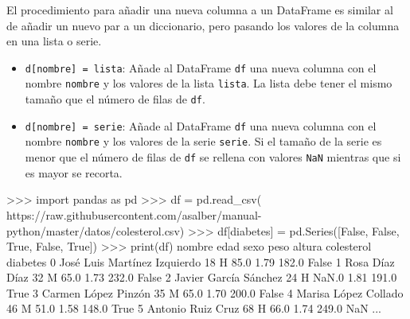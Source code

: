 \documentclass[
  spanish,
  a4paper,
]{scrreport}
\newenvironment{Shaded}{\begin{snugshade}}{\end{snugshade}}
\newcommand{\BuiltInTok}[1]{\textcolor[rgb]{0.00,0.23,0.31}{#1}}
\newcommand{\DecValTok}[1]{\textcolor[rgb]{0.68,0.00,0.00}{#1}}
\newcommand{\FloatTok}[1]{\textcolor[rgb]{0.68,0.00,0.00}{#1}}
\newcommand{\ImportTok}[1]{\textcolor[rgb]{0.00,0.46,0.62}{#1}}
\newcommand{\NormalTok}[1]{\textcolor[rgb]{0.00,0.23,0.31}{#1}}
\newcommand{\OperatorTok}[1]{\textcolor[rgb]{0.37,0.37,0.37}{#1}}
\newcommand{\StringTok}[1]{\textcolor[rgb]{0.13,0.47,0.30}{#1}}
\newcommand{\VariableTok}[1]{\textcolor[rgb]{0.07,0.07,0.07}{#1}}
\begin{document}
El procedimiento para añadir una nueva columna a un DataFrame es similar
al de añadir un nuevo par a un diccionario, pero pasando los valores de
la columna en una lista o serie.

\begin{itemize}
\item
  \texttt{d{[}nombre{]}\ =\ lista}: Añade al DataFrame \texttt{df} una
  nueva columna con el nombre \texttt{nombre} y los valores de la lista
  \texttt{lista}. La lista debe tener el mismo tamaño que el número de
  filas de \texttt{df}.
\item
  \texttt{d{[}nombre{]}\ =\ serie}: Añade al DataFrame \texttt{df} una
  nueva columna con el nombre \texttt{nombre} y los valores de la serie
  \texttt{serie}. Si el tamaño de la serie es menor que el número de
  filas de \texttt{df} se rellena con valores \texttt{NaN} mientras que
  si es mayor se recorta.
\end{itemize}

\begin{Shaded}
\begin{Highlighting}[]
\OperatorTok{\textgreater{}\textgreater{}\textgreater{}} \ImportTok{import}\NormalTok{ pandas }\ImportTok{as}\NormalTok{ pd}
\OperatorTok{\textgreater{}\textgreater{}\textgreater{}}\NormalTok{ df }\OperatorTok{=}\NormalTok{ pd.read\_csv(}
\StringTok{\textquotesingle{}https://raw.githubusercontent.com/asalber/manual{-}python/master/datos/colesterol.csv\textquotesingle{}}\NormalTok{)}
\OperatorTok{\textgreater{}\textgreater{}\textgreater{}}\NormalTok{ df[}\StringTok{\textquotesingle{}diabetes\textquotesingle{}}\NormalTok{] }\OperatorTok{=}\NormalTok{ pd.Series([}\VariableTok{False}\NormalTok{, }\VariableTok{False}\NormalTok{, }\VariableTok{True}\NormalTok{, }\VariableTok{False}\NormalTok{, }\VariableTok{True}\NormalTok{])}
\OperatorTok{\textgreater{}\textgreater{}\textgreater{}} \BuiltInTok{print}\NormalTok{(df)}
\NormalTok{                              nombre  edad sexo    peso  altura    colesterol diabetes}
\DecValTok{0}\NormalTok{       José Luis Martínez Izquierdo    }\DecValTok{18}\NormalTok{    H    }\FloatTok{85.0}    \FloatTok{1.79}         \FloatTok{182.0}    \VariableTok{False}
\DecValTok{1}\NormalTok{                     Rosa Díaz Díaz    }\DecValTok{32}\NormalTok{    M    }\FloatTok{65.0}    \FloatTok{1.73}         \FloatTok{232.0}    \VariableTok{False}
\DecValTok{2}\NormalTok{              Javier García Sánchez    }\DecValTok{24}\NormalTok{    H   NaN}\FloatTok{.0}    \FloatTok{1.81}         \FloatTok{191.0}     \VariableTok{True}
\DecValTok{3}\NormalTok{                Carmen López Pinzón    }\DecValTok{35}\NormalTok{    M    }\FloatTok{65.0}    \FloatTok{1.70}         \FloatTok{200.0}    \VariableTok{False}
\DecValTok{4}\NormalTok{               Marisa López Collado    }\DecValTok{46}\NormalTok{    M    }\FloatTok{51.0}    \FloatTok{1.58}         \FloatTok{148.0}     \VariableTok{True}
\DecValTok{5}\NormalTok{                  Antonio Ruiz Cruz    }\DecValTok{68}\NormalTok{    H    }\FloatTok{66.0}    \FloatTok{1.74}         \FloatTok{249.0}\NormalTok{      NaN}
\NormalTok{...}
\end{Highlighting}
\end{Shaded}
\end{document}
